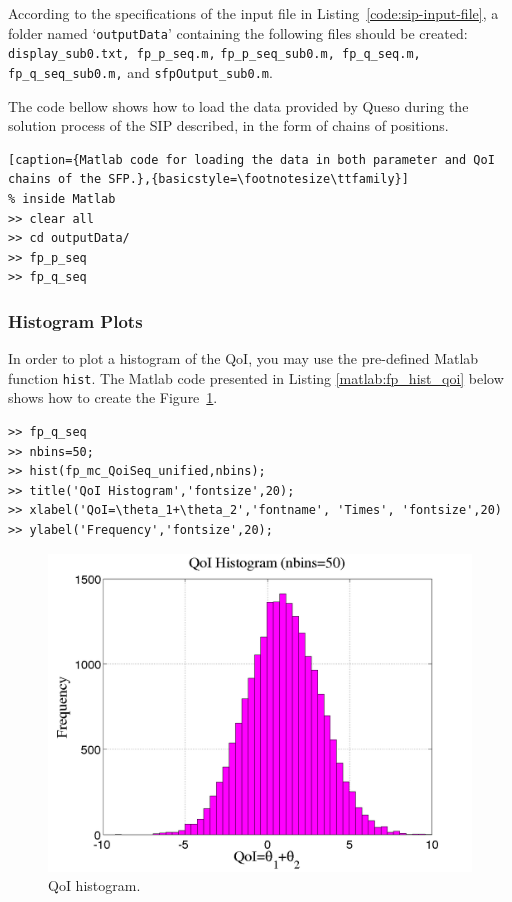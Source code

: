 According to the specifications of the input file in Listing~\ref{code:sip-input-file}, a folder named `\verb+outputData+' containing the following files should be created: \verb+display_sub0.txt, fp_p_seq.m,+ \linebreak \verb+fp_p_seq_sub0.m, fp_q_seq.m, fp_q_seq_sub0.m,+ and \verb+sfpOutput_sub0.m+.

The code bellow shows how to load the data provided by Queso during the solution process of the SIP described, in the form of 
chains of positions.

\begin{lstlisting}[caption={Matlab code for loading the data in both parameter and QoI chains of the SFP.},{basicstyle=\footnotesize\ttfamily}]
% inside Matlab
>> clear all
>> cd outputData/
>> fp_p_seq
>> fp_q_seq
\end{lstlisting}



\subsubsection{Histogram Plots}

In order to plot a histogram of the QoI, you may use the pre-defined Matlab function \verb+hist+.
The Matlab code presented in Listing \ref{matlab:fp_hist_qoi} below shows how to create the Figure~\ref{fig:fp_qoi_hist}.

\begin{lstlisting}[label=matlab:fp_hist_qoi,caption={Matlab code for the QoI histogram plot.}]
% inside Matlab
>> fp_q_seq
>> nbins=50;
>> hist(fp_mc_QoiSeq_unified,nbins);
>> title('QoI Histogram','fontsize',20);
>> xlabel('QoI=\theta_1+\theta_2','fontname', 'Times', 'fontsize',20)
>> ylabel('Frequency','fontsize',20);
\end{lstlisting}

\begin{figure}[htb]
\centering 
\includegraphics[scale=0.35]{rawfigs/simple_fp_qoi_hist.png}
\vspace{-10pt}
\caption{QoI histogram.}
\label{fig:fp_qoi_hist}
\end{figure}

